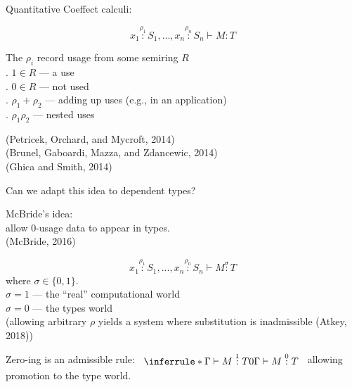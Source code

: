 \documentclass[xetex,serif,mathserif,aspectratio=169]{beamer}
\begin{document}
\begin{frame}
  Quantitative Coeffect calculi:

  \begin{displaymath}
    x_1 \stackrel{\rho_1}: S_1, \dots, x_n \stackrel{\rho_n}: S_n \vdash M : T
  \end{displaymath}

  \pause
  \bigskip

  \point The $\rho_i$ record usage from some semiring $R$ \\
  \quad . $1 \in R$ --- a use \\
  \quad . $0 \in R$ --- not used \\
  \quad . $\rho_1 + \rho_2$ --- adding up uses (e.g., in an application) \\
  \quad . $\rho_1\rho_2$ --- nested uses

  \pause
  \bigskip

  {\footnotesize
    \textcolor{black!60}{(Petricek, Orchard, and Mycroft, 2014)} \\
    \textcolor{black!60}{(Brunel, Gaboardi, Mazza, and Zdancewic, 2014)} \\
    \textcolor{black!60}{(Ghica and Smith, 2014)} \\
  }
\end{frame}

\begin{frame}
  Can we adapt this idea to dependent types?

  \pause
  \bigskip

  McBride's idea: \\
  \quad \point allow $0$-usage data to appear in types. \\
  \qquad \textcolor{black!60}{(McBride, 2016)}

  \pause

  \begin{displaymath}
    x_1 \stackrel{\rho_1}: S_1, \dots, x_n \stackrel{\rho_n}: S_n \vdash M \stackrel\sigma: T
  \end{displaymath}
  where $\sigma \in \{0,1\}$. \\
  \qquad \point $\sigma = 1$ --- the ``real'' computational world \\
  \qquad \point $\sigma = 0$ --- the types world \\
  {\footnotesize \textcolor{black!60}{(allowing arbitrary $\rho$ yields a system where substitution is inadmissible (Atkey, 2018))}}


  \pause
  \bigskip

  Zero-ing is an admissible rule:
  $\begin{array}{c}\inferrule* {\Gamma \vdash M \stackrel{1}: T} {0\Gamma \vdash M
    \stackrel{0}: T}\end{array}$ allowing promotion to the type world.
\end{frame}
\end{document}
